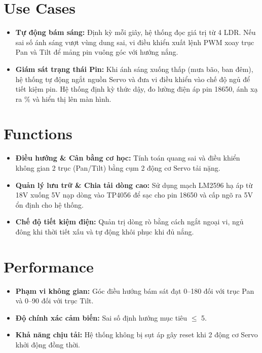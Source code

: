 \documentclass[12pt,a4paper]{report}
\begin{document}
\section{Use Cases}
\begin{itemize}[leftmargin=1.5em,itemsep=3pt]
  \item \textbf{Tự động bám sáng: }Định kỳ mỗi giây, hệ thống đọc giá trị từ 4 LDR. Nếu sai số ánh sáng vượt vùng dung sai, vi điều khiển xuất lệnh PWM xoay trục Pan và Tilt để mảng pin vuông góc với hướng nắng.
  \item \textbf{Giám sát trạng thái Pin: }Khi ánh sáng xuống thấp (mưa bão, ban đêm), hệ thống tự động ngắt nguồn Servo và đưa vi điều khiển vào chế độ ngủ để tiết kiệm pin. Hệ thống định kỳ thức dậy, đo lường điện áp pin 18650, ánh xạ ra \% và hiển thị lên màn hình.
\end{itemize}

\section{Functions}
\begin{itemize}[leftmargin=1.5em,itemsep=3pt]
  \item \textbf{Điều hướng \& Cân bằng cơ học: }Tính toán quang sai và điều khiển không gian 2 trục (Pan/Tilt) bằng cụm 2 động cơ Servo tải nặng.
  \item \textbf{Quản lý lưu trữ \& Chia tải dòng cao: }Sử dụng mạch LM2596 hạ áp từ 18V xuống 5V nạp dòng vào TP4056 để sạc cho pin 18650 và cấp ngõ ra 5V ổn định cho hệ thống.
  \item \textbf{Chế độ tiết kiệm điện: }Quản trị dòng rò bằng cách ngắt ngoại vi, ngủ đông khi thời tiết xấu và tự động khôi phục khi đủ nắng.
\end{itemize}

\section{Performance}
\begin{itemize}[leftmargin=1.5em,itemsep=3pt]
  \item \textbf{Phạm vi không gian: }Góc điều hướng bám sát đạt 0\textdegree{}--180\textdegree{} đối với trục Pan và 0\textdegree{}--90\textdegree{} đối với trục Tilt.
  \item \textbf{Độ chính xác cảm biến: }Sai số định hướng mục tiêu \ensuremath{\le} \textpm{}5\textdegree{}.
  \item \textbf{Khả năng chịu tải: }Hệ thống không bị sụt áp gây reset khi 2 động cơ Servo khởi động đồng thời.
\end{itemize}
\end{document}
